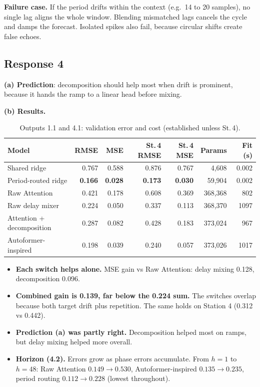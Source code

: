 \documentclass[11pt]{article}
\begin{document}
\textbf{Failure case.} If the period drifts within the context (e.g.\ 14 to 20 samples), no single
lag aligns the whole window. Blending mismatched lags cancels the cycle and damps the forecast.
Isolated spikes also fail, because circular shifts create false echoes.

\subsection*{Response 4}

\textbf{(a) Prediction}: decomposition should help most when drift
is prominent, because it hands the ramp to a linear head before mixing.

\textbf{(b) Results.}

\begin{table}[h]\centering\small
\begin{tabular}{lrrrrrr}
\toprule
Model & RMSE & MSE & St.\,4 RMSE & St.\,4 MSE & Params & Fit (s)\\
\midrule
Shared ridge & 0.767 & 0.588 & 0.876 & 0.767 & 4{,}608 & 0.002\\
Period-routed ridge & \textbf{0.166} & \textbf{0.028} & \textbf{0.173} & \textbf{0.030} & 59{,}904 & 0.002\\
Raw Attention & 0.421 & 0.178 & 0.608 & 0.369 & 368{,}368 & 802\\
Raw delay mixer & 0.224 & 0.050 & 0.337 & 0.113 & 368{,}370 & 1097\\
Attention + decomposition & 0.287 & 0.082 & 0.428 & 0.183 & 373{,}024 & 967\\
Autoformer-inspired & 0.198 & 0.039 & 0.240 & 0.057 & 373{,}026 & 1017\\
\bottomrule
\end{tabular}
\caption{Outputs 1.1 and 4.1: validation error and cost (established unless St.\,4).}
\end{table}

\begin{itemize}
  \item \textbf{Each switch helps alone.} MSE gain vs Raw Attention: delay mixing 0.128,
  decomposition 0.096.
  \item \textbf{Combined gain is 0.139, far below the 0.224 sum.} The switches overlap because both
  target drift plus repetition. The same holds on Station 4 (0.312 vs 0.442).
  \item \textbf{Prediction (a) was partly right.} Decomposition helped most on ramps, but delay
  mixing helped more overall.
  \item \textbf{Horizon (4.2).} Errors grow as phase errors accumulate. From $h=1$ to $h=48$:
  Raw Attention $0.149\to0.530$, Autoformer-inspired $0.135\to0.235$, period routing
  $0.112\to0.228$ (lowest throughout).
\end{itemize}
\end{document}
